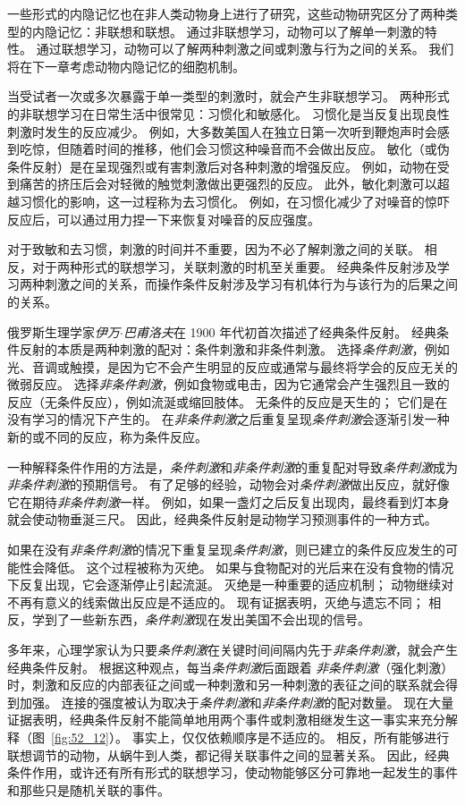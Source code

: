 一些形式的内隐记忆也在非人类动物身上进行了研究，这些动物研究区分了两种类型的内隐记忆：非联想和联想。
通过非联想学习，动物可以了解单一刺激的特性。
通过联想学习，动物可以了解两种刺激之间或刺激与行为之间的关系。
我们将在下一章考虑动物内隐记忆的细胞机制。


当受试者一次或多次暴露于单一类型的刺激时，就会产生非联想学习。
两种形式的非联想学习在日常生活中很常见：习惯化和敏感化。
习惯化是当反复出现良性刺激时发生的反应减少。
例如，大多数美国人在独立日第一次听到鞭炮声时会感到吃惊，但随着时间的推移，他们会习惯这种噪音而不会做出反应。
敏化（或伪条件反射）是在呈现强烈或有害刺激后对各种刺激的增强反应。
例如，动物在受到痛苦的挤压后会对轻微的触觉刺激做出更强烈的反应。
此外，敏化刺激可以超越习惯化的影响，这一过程称为去习惯化。
例如，在习惯化减少了对噪音的惊吓反应后，可以通过用力捏一下来恢复对噪音的反应强度。


对于致敏和去习惯，刺激的时间并不重要，因为不必了解刺激之间的关联。
相反，对于两种形式的联想学习，关联刺激的时机至关重要。
经典条件反射涉及学习两种刺激之间的关系，而操作条件反射涉及学习有机体行为与该行为的后果之间的关系。


俄罗斯生理学家\textit{伊万$\cdot$巴甫洛夫}在 1900 年代初首次描述了经典条件反射。
经典条件反射的本质是两种刺激的配对：条件刺激和非条件刺激。
选择\textit{条件刺激}，例如光、音调或触摸，是因为它不会产生明显的反应或通常与最终将学会的反应无关的微弱反应。
选择\textit{非条件刺激}，例如食物或电击，因为它通常会产生强烈且一致的反应（无条件反应），例如流涎或缩回肢体。
无条件的反应是天生的；
它们是在没有学习的情况下产生的。
在\textit{非条件刺激}之后重复呈现\textit{条件刺激}会逐渐引发一种新的或不同的反应，称为条件反应。


一种解释条件作用的方法是，\textit{条件刺激}和\textit{非条件刺激}的重复配对导致\textit{条件刺激}成为\textit{非条件刺激}的预期信号。
有了足够的经验，动物会对\textit{条件刺激}做出反应，就好像它在期待\textit{非条件刺激}一样。
例如，如果一盏灯之后反复出现肉，最终看到灯本身就会使动物垂涎三尺。
因此，经典条件反射是动物学习预测事件的一种方式。


如果在没有\textit{非条件刺激}的情况下重复呈现\textit{条件刺激}，则已建立的条件反应发生的可能性会降低。
这个过程被称为灭绝。
如果与食物配对的光后来在没有食物的情况下反复出现，它会逐渐停止引起流涎。
灭绝是一种重要的适应机制；
动物继续对不再有意义的线索做出反应是不适应的。
现有证据表明，灭绝与遗忘不同；
相反，学到了一些新东西，\textit{条件刺激}现在发出美国不会出现的信号。


多年来，心理学家认为只要\textit{条件刺激}在关键时间间隔内先于\textit{非条件刺激}，就会产生经典条件反射。
根据这种观点，每当\textit{条件刺激}后面跟着 \textit{非条件刺激}（强化刺激）时，刺激和反应的内部表征之间或一种刺激和另一种刺激的表征之间的联系就会得到加强。
连接的强度被认为取决于\textit{条件刺激}和\textit{非条件刺激}的配对数量。
现在大量证据表明，经典条件反射不能简单地用两个事件或刺激相继发生这一事实来充分解释（图~\ref{fig:52_12}）。
事实上，仅仅依赖顺序是不适应的。
相反，所有能够进行联想调节的动物，从蜗牛到人类，都记得关联事件之间的显著关系。
因此，经典条件作用，或许还有所有形式的联想学习，使动物能够区分可靠地一起发生的事件和那些只是随机关联的事件。


